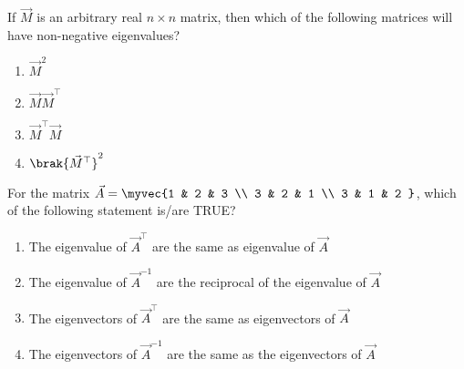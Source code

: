 \item If $\vec{M}$ is an arbitrary real $n \times n$ matrix, then which of the following matrices will have non-negative eigenvalues?
\hfill{}
\begin{enumerate}
\item $\vec{M}^2$
\item $\vec{M}\vec{M}^{\top}$
\item $\vec{M}^{\top}\vec{M}$
\item $\brak{\vec{M}^{\top}}^2$
\end{enumerate}
\item For the matrix
$\vec{A} = \myvec{1 & 2 & 3 \\
3 & 2 & 1 \\
3 & 1 & 2
}$,
which of the following statement is/are TRUE?

\hfill{}
\begin{enumerate}
\item The eigenvalue of $\vec{A}^{\top}$ are the same as eigenvalue of  $\vec{A}$
\item The eigenvalue of $\vec{A}^{-1}$ are the reciprocal of the eigenvalue of  $\vec{A}$
\item The eigenvectors of $\vec{A}^{\top}$ are the same as eigenvectors of  $\vec{A}$
\item The eigenvectors of $\vec{A}^{-1}$ are the same as the eigenvectors of  $\vec{A}$
\end{enumerate}
